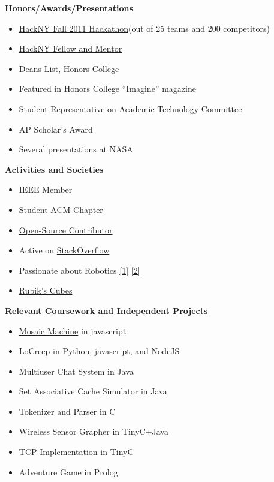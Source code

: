 \documentclass[letterpaper,11pt]{article}
\newcommand{\resitem}[1]{\item #1 \vspace{-2pt}}
\newcommand{\resheading}[1]{{\large \colorbox{mygrey}{\begin{minipage}{\textwidth}{\textbf{#1 \vphantom{p\^{E}}}}\end{minipage}}}}
\begin{document}
\resheading{Honors/Awards/Presentations}
\begin{itemize}
   \resitem{\href{http://www.youtube.com/watch?v=ga6RPRAFRUY}{HackNY Fall 2011 Hackathon}(out of 25 teams and 200 competitors)}
   \resitem{\href{http://hackny.org/a/about/}{HackNY Fellow and Mentor}}
   \resitem{Deans List, Honors College}
   \resitem{Featured in Honors College ``Imagine'' magazine}
   \resitem{Student Representative on Academic Technology Committee}
   \resitem{AP Scholar's Award}
   \resitem{Several presentations at NASA}
\end{itemize}
\resheading{Activities and Societies}
\begin{itemize}
   \resitem{IEEE Member}
   \resitem{\href{http://polaris.cs.wcu.edu/~acm/}{Student ACM Chapter}}
   \resitem{\href{https://github.com/ranman}{Open-Source Contributor}}
   \resitem{Active on \href{http://stackoverflow.com/users/240004/ranman}{StackOverflow}}
   \resitem{Passionate about Robotics
      \href{http://robotics.punahou.edu/}{[1]}
      \href{http://irg.arc.nasa.gov}{[2]}}
   \resitem{\href{http://www.youtube.com/user/ranman96734}{Rubik's Cubes}}
\end{itemize}
\resheading{Relevant Coursework and Independent Projects}
\begin{itemize}
   \resitem{\href{http://www.mosaicmachine.com/}{Mosaic Machine} in javascript}
   \resitem{\href{http://www.locreep.com/}{LoCreep} in Python, javascript, and NodeJS}
   \resitem{Multiuser Chat System in Java}
   \resitem{Set Associative Cache Simulator in Java}
   \resitem{Tokenizer and Parser in C}
   \resitem{Wireless Sensor Grapher in TinyC+Java}
   \resitem{TCP Implementation in TinyC}
   \resitem{Adventure Game in Prolog}
\end{itemize}
\end{document}
